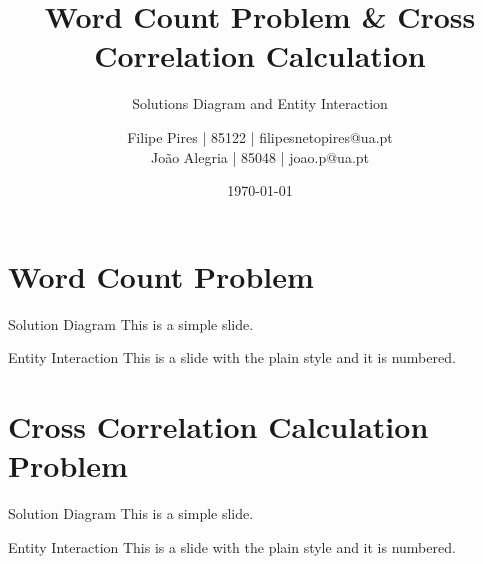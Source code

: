 \documentclass{beamer}
\title{Word Count Problem \& Cross Correlation Calculation}
\subtitle{Solutions Diagram and Entity Interaction}
\author{Filipe Pires | 85122 | filipesnetopires@ua.pt \\ João Alegria | 85048 | joao.p@ua.pt}
\institute{University of Aveiro, DETI}
\date{\today}
\begin{document}

\begin{frame}
	\maketitle %
\end{frame}


\section{Word Count Problem} %


\begin{frame}{Solution Diagram}
	This is a simple slide.
\end{frame}


\begin{frame}{Entity Interaction}
	This is a slide with the plain style and it is numbered.
\end{frame}


\section{Cross Correlation Calculation Problem} %


\begin{frame}{Solution Diagram}
	This is a simple slide.
\end{frame}


\begin{frame}{Entity Interaction}
	This is a slide with the plain style and it is numbered.
\end{frame}
\end{document}
